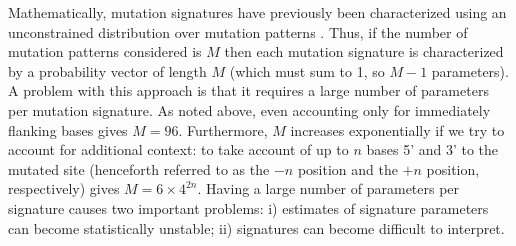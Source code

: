 \documentclass[10pt,letterpaper]{article}
\begin{document}

Mathematically, mutation signatures have previously been characterized using an unconstrained distribution over mutation patterns \cite{pmid23318258,pmid23628380}. Thus, if the number of mutation patterns considered is $M$ then each
mutation signature is characterized by a probability vector
of length $M$ (which must sum to 1, so $M-1$ parameters). 
A problem with this approach is that
it requires a large number of parameters per mutation signature. As noted above,
even accounting only for immediately flanking bases 
gives $M=96$.  Furthermore, $M$ increases exponentially if we try to account for additional context: to take account of up to $n$ bases 5' and 3' to the mutated site 
(henceforth referred to as the $-n$ position and the $+n$ position, respectively) gives $M=6 \times 4^{2n}$. 
Having a large number of parameters per signature causes
two important problems: i) estimates of signature parameters can become statistically unstable; ii) signatures can become
difficult to interpret.






\end{document}
